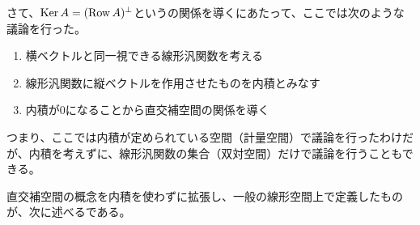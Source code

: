 \documentclass[../../../topic_linear-algebra]{subfiles}
\begin{document}
さて、$\operatorname{Ker} A = (\operatorname{Row} A)^\perp$というの関係を導くにあたって、ここでは次のような議論を行った。
\begin{enumerate}
  \item 横ベクトルと同一視できる線形汎関数を考える
  \item 線形汎関数に縦ベクトルを作用させたものを内積とみなす
  \item 内積が0になることから直交補空間の関係を導く
\end{enumerate}

つまり、ここでは内積が定められている空間（計量空間）で議論を行ったわけだが、内積を考えずに、線形汎関数の集合（双対空間）だけで議論を行うこともできる。

\br

直交補空間の概念を内積を使わずに拡張し、一般の線形空間上で定義したものが、次に述べるである。
\end{document}
